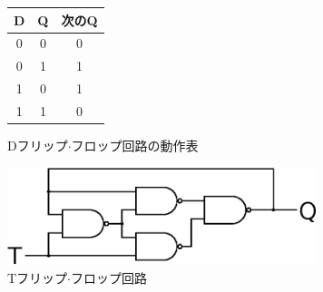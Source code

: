 \documentclass[uplatex]{jsarticle}
\makeatletter
\newcommand{\tblcaption}[1]{\def\@captype{table}\caption{#1}}
\makeatother
\begin{document}
\begin{description}
\begin{figure}[h]
\begin{minipage}{.4\textwidth}
\begin{center}
                            \begin{tabular}{c|c|c}\hline
                                D & Q & 次のQ \\ \hline
                                0 & 0 & 0 \\ \hline
                                0 & 1 & 1 \\ \hline
                                1 & 0 & 1 \\ \hline
                                1 & 1 & 0 \\ \hline
                            \end{tabular}
                        \end{center}
                        \tblcaption{Dフリップ$\cdot$フロップ回路の動作表}
                    \end{minipage}
                    \hfill
                    \begin{minipage}[c]{.6\textwidth}
                        \includegraphics[width = 9.0cm]{T.eps}
                    \caption{Tフリップ$\cdot$フロップ回路}
                  \end{minipage}
                \end{figure}
        \end{description}
\end{document}
